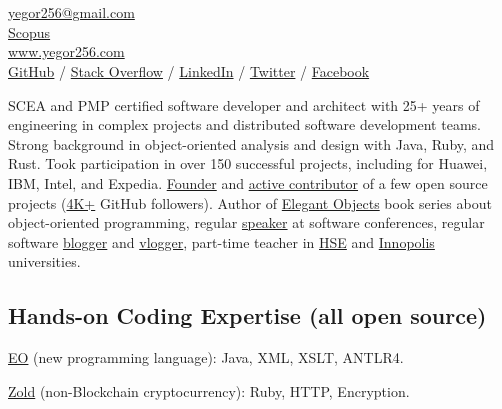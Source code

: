 \documentclass{vl}
\begin{document}
    \vlPrintPhoto{}

    \section*{\Large {}}

    \href{mailto:yegor256@gmail.com}{yegor256@gmail.com}\\%
    \href{https://www.scopus.com/authid/detail.uri?authorId=30367443600}{Scopus}\\%
    \href{https://www.yegor256.com}{www.yegor256.com}\\%
    \href{https://github.com/yegor256}{GitHub} /
    \href{https://stackexchange.com/users/63162/yegor256}{Stack Overflow} /
    \href{https://www.linkedin.com/in/yegor256}{LinkedIn} /
    \href{https://twitter.com/intent/follow?screen_name=yegor256}{Twitter} /
    \href{https://www.facebook.com/yegor256}{Facebook}

    \vspace*{12pt}

    SCEA and PMP certified software developer and architect with
    25+ years of engineering in complex projects and distributed software
    development teams. Strong background in object-oriented analysis and design
    with Java, Ruby, and Rust. Took participation in over 150 successful projects,
    including for Huawei, IBM, Intel, and Expedia. \href{https://www.yegor256.com/pets.html}{Founder}
    and \href{https://github.com/yegor256}{active contributor} of
    a few open source projects (\href{https://github.com/yegor256}{4K+} GitHub followers). Author of
    \href{https://www.yegor256.com/elegant-objects.html}{Elegant Objects}
    book series about object-oriented programming,
    regular \href{https://www.yegor256.com/talks.html}{speaker} at software conferences, regular software
    \href{https://www.yegor256.com}{blogger} and \href{https://www.youtube.com/c/yegor256}{vlogger},
    part-time teacher in \href{https://www.hse.ru/en/}{HSE} and \href{https://innopolis.university/en/}{Innopolis} universities.

    \subsection*{Hands-on Coding Expertise (all open source)}

    \href{https://www.eolang.org}{EO} (new programming language):
    Java, XML, XSLT, ANTLR4.

    \href{https://www.zold.io}{Zold} (non-Blockchain cryptocurrency):
    Ruby, HTTP, Encryption.
\end{document}
